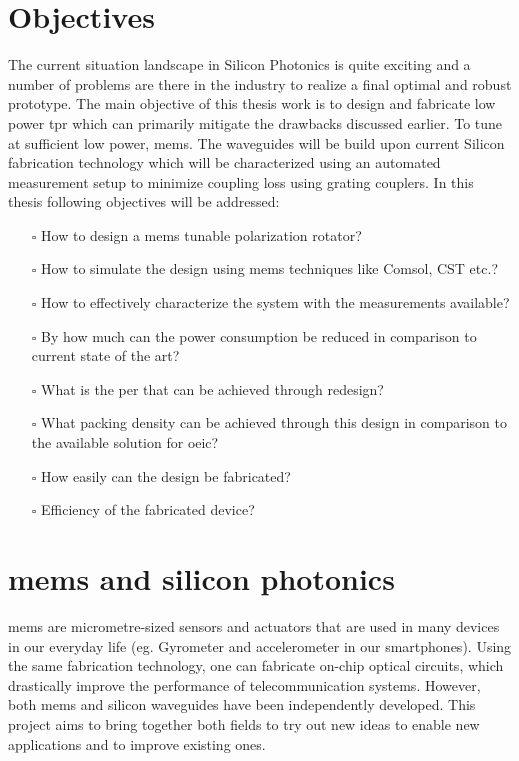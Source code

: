 \documentclass[../report.tex]{subfiles}
\begin{document}
	\section{Objectives}
The current situation landscape in Silicon Photonics is quite exciting and a number of problems are there in the industry to realize a final optimal and robust prototype. The main objective of this thesis work is to design and fabricate low power \gls{tpr} which can primarily mitigate the drawbacks discussed earlier. To tune at sufficient low power, \gls{mems}. The waveguides will be build upon current Silicon fabrication technology which will be characterized using an automated measurement setup to minimize coupling loss using grating couplers. In this thesis following objectives will be addressed:
\begin{itemize}
	\item[$\square$] How to design a \gls{mems} tunable polarization rotator?
	\item[$\square$] How to simulate the design using \gls{mems} techniques like Comsol, CST etc.?
	\item[$\square$] How to effectively characterize the system with the measurements available?
	\item[$\square$] By how much can the power consumption be reduced in comparison to current state of the art?
	\item[$\square$] What is the \gls{per} that can be achieved through redesign?
	\item[$\square$] What packing density can be achieved through this design in comparison to the available solution for \gls{oeic}?
	\item[$\square$] How easily can the design be fabricated?
	\item[$\square$] Efficiency of the fabricated device?
\end{itemize}

	\section{\gls{mems} and silicon photonics}
\gls{mems} are micrometre-sized sensors and actuators that are used in many devices in our everyday life (eg. Gyrometer and accelerometer in our smartphones). Using the same fabrication technology, one can fabricate on-chip optical circuits, which drastically improve the performance of telecommunication systems. However, both \gls{mems} and silicon waveguides have been independently developed. This project aims to bring together both fields to try out new ideas to enable new applications and to improve existing ones. 
	
\end{document}
